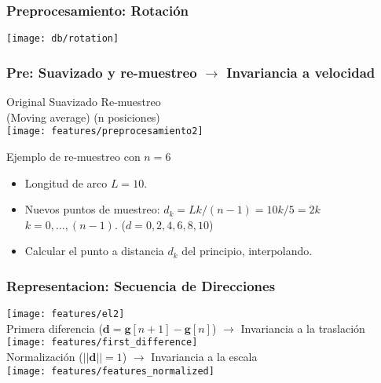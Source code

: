 \begin{myframe}
\frametitle{Preprocesamiento: Rotación}
\begin{center}
  \texttt{[image: db/rotation]}
\end{center}
\end{myframe}

\begin{myframe}
\frametitle{Pre: Suavizado y re-muestreo $\rightarrow$ Invariancia a velocidad}
\begin{center}
  Original  \hspace{55pt}  Suavizado \hspace{45pt} Re-muestreo \\ 
  \hspace{80pt}  (Moving average) \hspace{28pt} (n posiciones) \\ 
  \vspace{10pt}
  \texttt{[image: features/preprocesamiento2]}
\end{center}

\begin{block}{Ejemplo de re-muestreo con $n=6$}
\begin{itemize}
\item Longitud de arco $L=10$.
\item Nuevos puntos de muestreo: $d_k=Lk/(n-1)=10k/5=2k$ $k=0,\dots,(n-1)$. ($d=0,2,4,6,8,10$)
\item Calcular el punto a distancia $d_k$ del principio, interpolando.
\end{itemize}
\end{block}
\end{myframe}


\begin{myframe}
\frametitle{Representacion: Secuencia de Direcciones}
\begin{center}
\texttt{[image: features/el2]} \\
\vspace{7pt}
 Primera diferencia \arrowdown ($\mathbf{d}= \mathbf{g}[n+1] - \mathbf{g}[n] $) $\rightarrow$ Invariancia a la traslación \\
\vspace{5pt}
\texttt{[image: features/first\_difference]}\\
\vspace{5pt}
 Normalización  \arrowdown ($||\mathbf{d}||=1$) $\rightarrow$ Invariancia a la escala\\
\vspace{5pt}
\texttt{[image: features/features\_normalized]}
\end{center}

\end{myframe}
